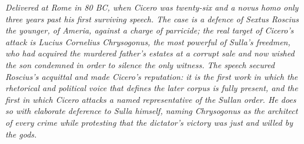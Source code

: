 
\textit{Delivered at Rome in 80 BC, when Cicero was twenty-six and a
\textsl{novus homo} only three years past his first surviving speech.
The case is a defence of Sextus Roscius the younger, of Ameria, against
a charge of parricide; the real target of Cicero's attack is Lucius
Cornelius Chrysogonus, the most powerful of Sulla's freedmen, who had
acquired the murdered father's estates at a corrupt sale and now wished
the son condemned in order to silence the only witness. The speech
secured Roscius's acquittal and made Cicero's reputation: it is the
first work in which the rhetorical and political voice that defines the
later corpus is fully present, and the first in which Cicero attacks a
named representative of the Sullan order. He does so with elaborate
deference to Sulla himself, naming Chrysogonus as the architect of every
crime while protesting that the dictator's victory was just and willed
by the gods.}
